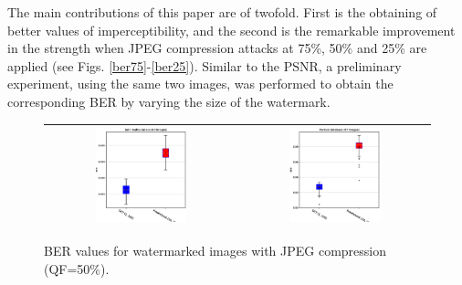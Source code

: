 \documentclass[runningheads]{llncs}
\begin{document}
The main contributions of this paper are of twofold. First is the obtaining of better values of imperceptibility, and the second is the remarkable improvement in the strength when JPEG compression attacks at 75\%, 50\% and 25\% are applied (see Figs. \ref{ber75}-\ref{ber25}). Similar to the PSNR, a preliminary experiment, using the same two images, was performed to obtain the corresponding BER by varying the size of the watermark.
\begin{figure}[H]
	\begin{center}
		\begin{tabular}{|c|c|}\hline
			\includegraphics[width=0.5\textwidth]{BER50SaintGall.eps}
			&\includegraphics[width=0.5\textwidth]{BER50Parzival.eps}\\\hline
		\end{tabular}
	\end{center}
	\caption{BER values for watermarked images with JPEG compression (QF=50\%).}
	\label{ber50}
\end{figure}
\end{document}
